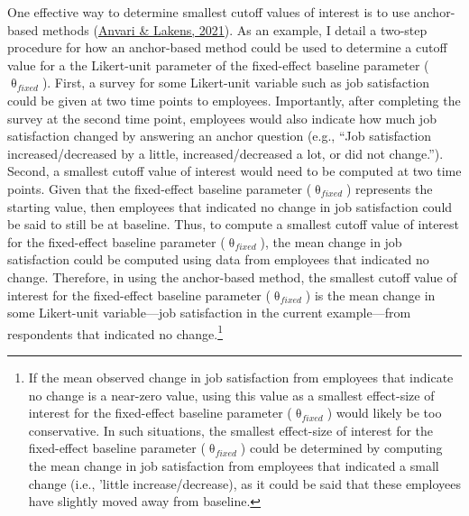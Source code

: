 \documentclass[
12pt, %
twoside,
english]{guelphthesis}
\begin{document}
One effective way to determine smallest cutoff values of interest is to use anchor-based methods (\protect\hyperlink{ref-anvari2021}{Anvari \& Lakens, 2021}). As an example, I detail a two-step procedure for how an anchor-based method could be used to determine a cutoff value for a the Likert-unit parameter of the fixed-effect baseline parameter (\(\uptheta_{fixed}\)). First, a survey for some Likert-unit variable such as job satisfaction could be given at two time points to employees. Importantly, after completing the survey at the second time point, employees would also indicate how much job satisfaction changed by answering an anchor question (e.g., ``Job satisfaction increased/decreased by a little, increased/decreased a lot, or did not change.''). Second, a smallest cutoff value of interest would need to be computed at two time points. Given that the fixed-effect baseline parameter (\(\uptheta_{fixed}\)) represents the starting value, then employees that indicated no change in job satisfaction could be said to still be at baseline. Thus, to compute a smallest cutoff value of interest for the fixed-effect baseline parameter (\(\uptheta_{fixed}\)), the mean change in job satisfaction could be computed using data from employees that indicated no change. Therefore, in using the anchor-based method, the smallest cutoff value of interest for the fixed-effect baseline parameter (\(\uptheta_{fixed}\)) is the mean change in some Likert-unit variable---job satisfaction in the current example---from respondents that indicated no change.\footnote{If the mean observed change in job satisfaction from employees that indicate no change is a near-zero value, using this value as a smallest effect-size of interest for the fixed-effect baseline parameter ($\uptheta_{fixed}$) would likely be too conservative. In such situations, the smallest effect-size of interest for the fixed-effect baseline parameter ($\uptheta_{fixed}$) could be determined by computing the mean change in job satisfaction from employees that indicated a small change (i.e., 'little increase/decrease), as it could be said that these employees have slightly moved away from baseline.}
\end{document}
